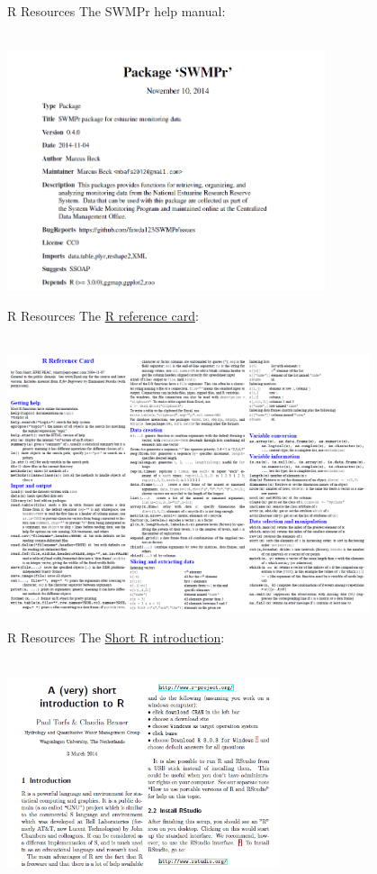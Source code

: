 \documentclass[xcolor=svgnames]{beamer}\usepackage[]{graphicx}\usepackage[]{color}
\begin{document}
\begin{frame}{R Resources}
The SWMPr help manual:\\~\\
\centerline{\includegraphics[width = 0.7\textwidth]{swmpr_manual.png}}
\end{frame}

\begin{frame}{R Resources}
The \href{http://cran.r-project.org/doc/contrib/Short-refcard.pdf}{R reference card}:\\~\\
\centerline{\includegraphics[width = 0.8\textwidth]{r_ref_card.png}}
\end{frame}

\begin{frame}[t]{R Resources}
The \href{http://cran.r-project.org/doc/contrib/Torfs+Brauer-Short-R-Intro.pdf}{Short R introduction}:\\~\\
\vfill
\centerline{\includegraphics[width = 0.6\textwidth]{r_tutorial.png}}
\vfill
\end{frame}
\end{document}
